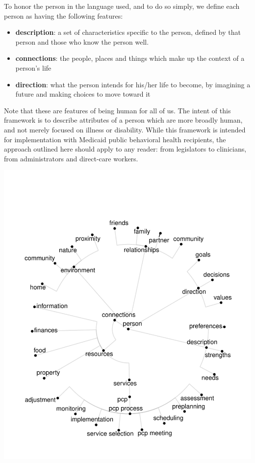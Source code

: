 \documentclass[
]{book}
\providecommand{\tightlist}{%
  \setlength{\itemsep}{0pt}\setlength{\parskip}{0pt}}
\begin{document}
To honor the person in the language used, and to do so simply, we define each person as having the following features:

\begin{itemize}
\tightlist
\item
  \textbf{description}: a set of characteristics specific to the person, defined by that person and those who know the person well.
\item
  \textbf{connections}: the people, places and things which make up the context of a person's life
\item
  \textbf{direction}: what the person intends for his/her life to become, by imagining a future and making choices to move toward it
\end{itemize}

Note that these are features of being human for all of us. The intent of this framework is to describe attributes of a person which are more broadly human, and not merely focused on illness or disability. While this framework is intended for implementation with Medicaid public behavioral health recipients, the approach outlined here should apply to any reader: from legislators to clinicians, from administrators and direct-care workers.

\includegraphics{person_centered_files/figure-latex/unnamed-chunk-8-1.pdf}
\end{document}
